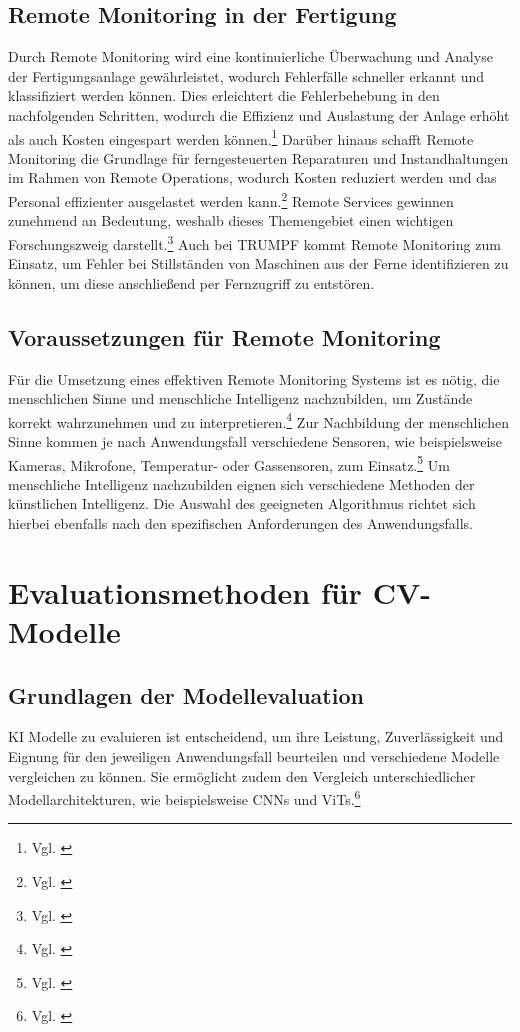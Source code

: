 \subsection{Remote Monitoring in der Fertigung}
Durch Remote Monitoring wird eine kontinuierliche Überwachung und Analyse der Fertigungsanlage gewährleistet, wodurch Fehlerfälle schneller erkannt und klassifiziert werden können. Dies erleichtert die Fehlerbehebung in den nachfolgenden Schritten, wodurch die Effizienz und Auslastung der Anlage erhöht als auch Kosten eingespart werden können.\footnote{Vgl. \cite[S. 110]{holtbrugge_remote_2007}} Darüber hinaus schafft Remote Monitoring die Grundlage für ferngesteuerten Reparaturen und Instandhaltungen im Rahmen von Remote Operations, wodurch Kosten reduziert werden und das Personal effizienter ausgelastet werden kann.\footnote{Vgl. \cite[S. 5, 110]{holtbrugge_remote_2007}} Remote Services gewinnen zunehmend an Bedeutung, weshalb dieses Themengebiet einen wichtigen Forschungszweig darstellt.\footnote{Vgl. \cite[S. 5]{holtbrugge_remote_2007}}
Auch bei TRUMPF kommt Remote Monitoring zum Einsatz, um Fehler bei Stillständen von Maschinen aus der Ferne identifizieren zu können, um diese anschließend per Fernzugriff zu entstören.

\subsection{Voraussetzungen für Remote Monitoring}
Für die Umsetzung eines effektiven Remote Monitoring Systems ist es nötig, die menschlichen Sinne und menschliche Intelligenz nachzubilden, um Zustände korrekt wahrzunehmen und zu interpretieren.\footnote{Vgl. \cite[S. 596]{vogel-heuser_remote_2024}} Zur Nachbildung der menschlichen Sinne kommen je nach Anwendungsfall verschiedene Sensoren, wie beispielsweise Kameras, Mikrofone, Temperatur- oder Gassensoren, zum Einsatz.\footnote{Vgl. \cite[S. 596 f.]{vogel-heuser_remote_2024}} Um menschliche Intelligenz nachzubilden eignen sich verschiedene Methoden der künstlichen Intelligenz. Die Auswahl des geeigneten Algorithmus richtet sich hierbei ebenfalls nach den spezifischen Anforderungen des Anwendungsfalls.\cite[S. 597]{vogel-heuser_remote_2024}


\section[Evaluationsmethoden für Computer Vision-Modelle]{Evaluationsmethoden für \ac{CV}-Modelle}

\subsection{Grundlagen der Modellevaluation}
\ac{KI} Modelle zu evaluieren ist entscheidend, um ihre Leistung, Zuverlässigkeit und Eignung für den jeweiligen Anwendungsfall beurteilen und verschiedene Modelle vergleichen zu können. Sie ermöglicht zudem den Vergleich unterschiedlicher Modellarchitekturen, wie beispielsweise \acp{CNN} und \acp{ViT}.\footnote{Vgl. \cite[S. 105281]{ali_adversarial_2024}}

